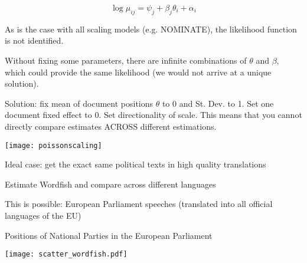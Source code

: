 \documentclass[kp]{foilpack}
\begin{document}
\[\log \mu_{ij} = \psi_{j} + \beta_{j}\theta_{i} +  \alpha_{i}\]

	As is the case with all scaling models (e.g. NOMINATE), the likelihood function is not identified.
		
	  Without fixing some parameters, there are infinite combinations of $\theta$ and $\beta$, which could provide the same likelihood (we would not arrive at a unique solution). 
    

Solution: fix  mean of document positions %
$\theta$ to 0 and St. Dev. to 1. Set one document fixed effect to 0. Set directionality of scale. This means that you cannot directly compare estimates ACROSS different estimations.



\centerline{\texttt{[image: poissonscaling]}}






 Ideal case: get the exact same political texts in high quality translations

 Estimate Wordfish and compare across different languages

 This is possible: European Parliament speeches (translated into all official languages of the EU)





\begin{center}
Positions of National Parties in the European Parliament


\texttt{[image: scatter\_wordfish.pdf]}

\end{center}
\end{document}
